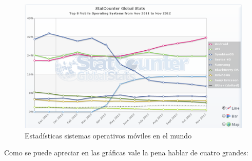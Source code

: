 \documentclass[11pt]{book}
\begin{document}
\begin{figure}[H]
  \centering
    \includegraphics[width=1.0\textwidth]{estadisticas_4}
  \caption{Estadísticas sistemas operativos móviles en el mundo}
  \label{fig:estadisticas4}
\end{figure}

Como se puede apreciar en las gráficas vale la pena hablar de cuatro grandes:
\end{document}
